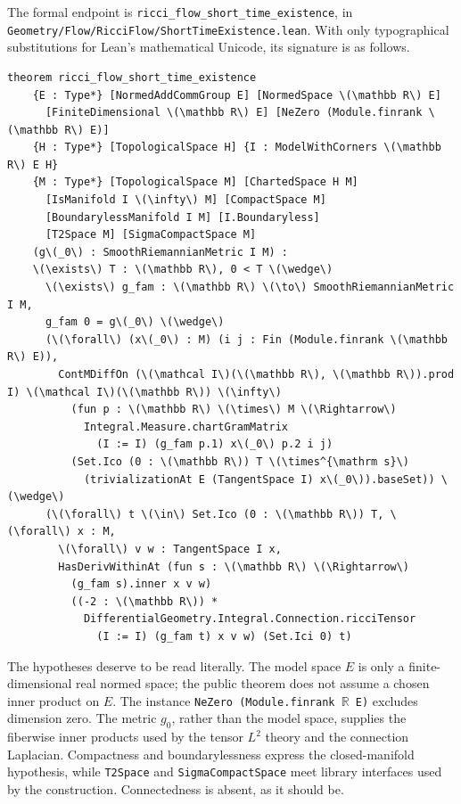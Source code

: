 \documentclass[11pt]{article}
\theoremstyle{plain}
\theoremstyle{definition}
\theoremstyle{remark}
\newcommand{\leanref}[1]{\nolinkurl{#1}}
\newcommand{\leanfile}[1]{\nolinkurl{#1}}
\newcommand{\rffile}[1]{\leanfile{#1}}
\begin{document}
The formal endpoint is
\leanref{ricci_flow_short_time_existence}, in
\rffile{Geometry/Flow/RicciFlow/ShortTimeExistence.lean}.  With only
typographical substitutions for Lean's mathematical Unicode, its signature is
as follows.

\begin{Verbatim}[commandchars=\\\{\},breaklines=true,breakanywhere=true,fontsize=\small]
theorem ricci_flow_short_time_existence
    {E : Type*} [NormedAddCommGroup E] [NormedSpace \(\mathbb R\) E]
      [FiniteDimensional \(\mathbb R\) E] [NeZero (Module.finrank \(\mathbb R\) E)]
    {H : Type*} [TopologicalSpace H] {I : ModelWithCorners \(\mathbb R\) E H}
    {M : Type*} [TopologicalSpace M] [ChartedSpace H M]
      [IsManifold I \(\infty\) M] [CompactSpace M]
      [BoundarylessManifold I M] [I.Boundaryless]
      [T2Space M] [SigmaCompactSpace M]
    (g\(_0\) : SmoothRiemannianMetric I M) :
    \(\exists\) T : \(\mathbb R\), 0 < T \(\wedge\)
      \(\exists\) g_fam : \(\mathbb R\) \(\to\) SmoothRiemannianMetric I M,
      g_fam 0 = g\(_0\) \(\wedge\)
      (\(\forall\) (x\(_0\) : M) (i j : Fin (Module.finrank \(\mathbb R\) E)),
        ContMDiffOn (\(\mathcal I\)(\(\mathbb R\), \(\mathbb R\)).prod I) \(\mathcal I\)(\(\mathbb R\)) \(\infty\)
          (fun p : \(\mathbb R\) \(\times\) M \(\Rightarrow\)
            Integral.Measure.chartGramMatrix
              (I := I) (g_fam p.1) x\(_0\) p.2 i j)
          (Set.Ico (0 : \(\mathbb R\)) T \(\times^{\mathrm s}\)
            (trivializationAt E (TangentSpace I) x\(_0\)).baseSet)) \(\wedge\)
      (\(\forall\) t \(\in\) Set.Ico (0 : \(\mathbb R\)) T, \(\forall\) x : M,
        \(\forall\) v w : TangentSpace I x,
        HasDerivWithinAt (fun s : \(\mathbb R\) \(\Rightarrow\)
          (g_fam s).inner x v w)
          ((-2 : \(\mathbb R\)) *
            DifferentialGeometry.Integral.Connection.ricciTensor
              (I := I) (g_fam t) x v w) (Set.Ici 0) t)
\end{Verbatim}

The hypotheses deserve to be read literally.  The model space $E$ is only a
finite-dimensional real normed space; the public theorem does not assume a
chosen inner product on $E$.  The instance
\texttt{NeZero (Module.finrank $\mathbb R$ E)} excludes dimension zero.  The
metric $g_0$, rather than the model space, supplies the fiberwise inner
products used by the tensor $L^2$ theory and the connection Laplacian.
Compactness and boundarylessness express the closed-manifold hypothesis, while
\texttt{T2Space} and \texttt{SigmaCompactSpace} meet library interfaces used
by the construction.  Connectedness is absent, as it should be.
\end{document}
